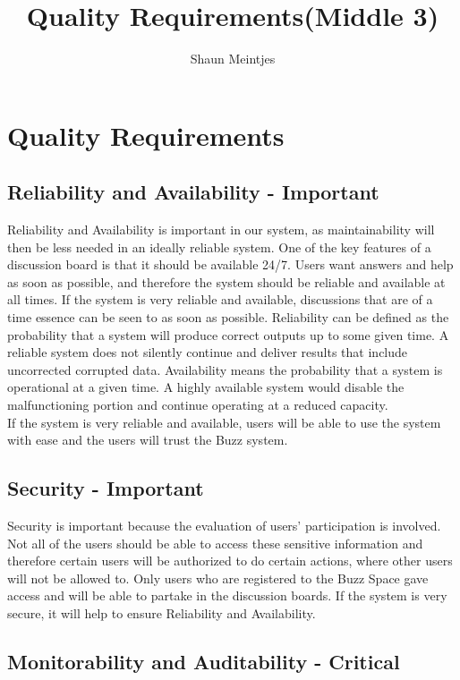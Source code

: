 \documentclass[12pt, a4paper]{article}
\begin{document}
\title{Quality Requirements(Middle 3)}
\author{Shaun Meintjes}
\maketitle
\pagebreak

\tableofcontents
\pagebreak

\section{Quality Requirements}
\subsection{Reliability and Availability - Important}
Reliability and Availability is important in our system, as maintainability will then be less needed in an ideally reliable system. One of the key features of a discussion board is that it should be available 24/7. Users want answers and help as soon as possible, and therefore the system should be reliable and available at all times. If the system is very reliable and available, discussions that are of a time essence can be seen to as soon as possible. Reliability can be defined as the probability that a system will produce correct outputs up to some given time. A reliable system does not silently continue and deliver results that include uncorrected corrupted data. Availability means the probability that a system is operational at a given time. A highly available system would disable the malfunctioning portion and continue operating at a reduced capacity. \\

If the system is very reliable and available, users will be able to use the system with ease and the users will trust the Buzz system.


\subsection{Security - Important}
Security is important because the evaluation of users' participation is involved. Not all of the users should be able to access these sensitive information and therefore certain users will be authorized to do certain actions, where other users will not be allowed to. Only users who are registered to the Buzz Space gave access and will be able to partake in the discussion boards. If the system is very secure, it will help to ensure Reliability and Availability.

\subsection{Monitorability and Auditability - Critical}
\end{document}
